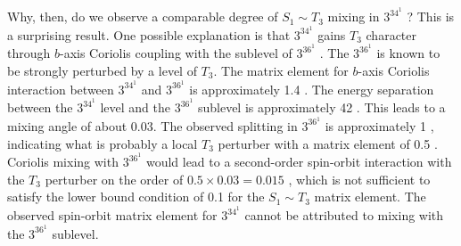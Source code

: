 \documentclass[12pt]{mitthesis}
\begin{document}
Why, then, do we observe a comparable degree of $S_1 \sim T_3$ mixing
in $3^34^1$ ?  This is a surprising result.  One possible
explanation is that $3^34^1$  gains $T_3$ character through
$b$-axis Coriolis coupling with the  sublevel of $3^36^1$
.  The $3^36^1$  is known to be strongly perturbed by a
level of $T_3$.  The matrix element for $b$-axis Coriolis interaction
between $3^34^1$  and $3^36^1$  is approximately 1.4 \rcm.
The energy separation between the $3^34^1$  level and the
$3^36^1$  sublevel is approximately 42 \rcm.  This leads to a
mixing angle of about 0.03.  The observed splitting in $3^36^1$ 
is approximately 1 \rcm, indicating what is probably a local $T_3$
perturber with a matrix element of 0.5 \rcm.  Coriolis mixing with
$3^36^1$  would lead to a second-order spin-orbit interaction
with the $T_3$ perturber on the order of $0.5 \times 0.03 = 0.015$
\rcm, which is not sufficient to satisfy the lower bound condition of
0.1 \rcm for the $S_1 \sim T_3$ matrix element.  The observed
spin-orbit matrix element for $3^34^1$  cannot be attributed to
mixing with the $3^36^1$  sublevel.


\end{document}
